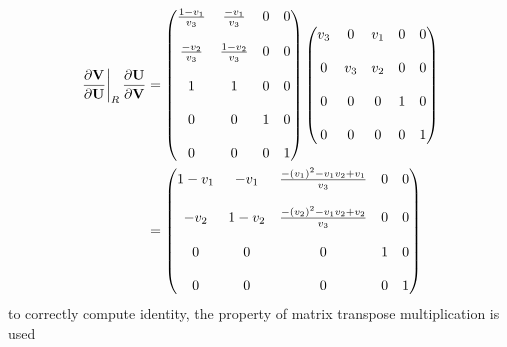 \documentclass[a4paper]{report}
\begin{document}
\begin{equation}
  \begin{aligned}
    \left. \frac{\partial \mathbf V}{\partial \mathbf U}\right|_{R} \frac{\partial \mathbf U}{\partial \mathbf V} &= 
    \begin{pmatrix}
      \frac{1-v_1}{v_3} & \frac{-v_1}{v_3}  & 0 & 0 \\ \\
      \frac{-v_2}{v_3}  & \frac{1-v_2}{v_3} & 0 & 0 \\ \\
      1                 & 1                 & 0 & 0 \\ \\
      0                 & 0                 & 1 & 0 \\ \\
      0                 & 0                 & 0 & 1
    \end{pmatrix}
    \begin{pmatrix}
      v_3 & 0   & v_1 & 0 & 0 \\ \\
      0   & v_3 & v_2 & 0 & 0 \\ \\
      0   & 0   & 0   & 1 & 0 \\ \\
      0   & 0   & 0   & 0 & 1
    \end{pmatrix} \\
    &= 
    \begin{pmatrix}
      1-v_1 & -v_1  & \frac{-(v_1)^2 - v_1 v_2 + v_1}{v_3} & 0 & 0 \\ \\
      -v_2  & 1-v_2 & \frac{-(v_2)^2 - v_1 v_2 + v_2}{v_3} & 0 & 0 \\ \\
      0     & 0     & 0                                    & 1 & 0 \\ \\
      0     & 0     & 0                                    & 0 & 1
    \end{pmatrix}
  \end{aligned}
  \label{dvdu-jac-right-I-bad}
\end{equation}
to correctly compute identity, the property of matrix transpose multiplication
is used
\end{document}
